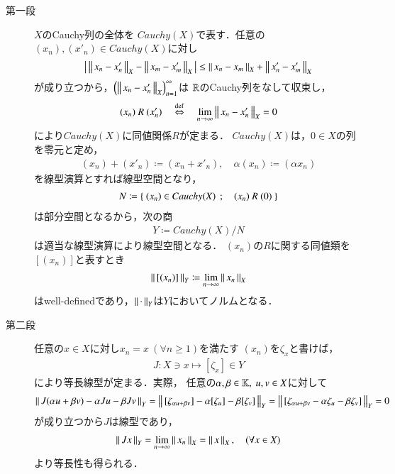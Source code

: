 	\begin{prf}\mbox{}
		\begin{description}
			\item[第一段]
				$X$のCauchy列の全体を
				$Cauchy(X)$で表す．任意の$(x_n),(x'_n) \in Cauchy(X)$に対し
				\begin{align}
					\left|\, \left\|\, x_n - x'_n\, \right\|_{X} - \left\|\, x_m - x'_m\, \right\|_{X}\, \right|
					\leq \left\|\, x_n - x_m\, \right\|_{X} + \left\|\, x'_n - x'_m\, \right\|_{X}
				\end{align}
				が成り立つから，$\left( \left\|\, x_n - x'_n\, \right\|_{X} \right)_{n=1}^\infty$は
				$\mathbb{R}$のCauchy列をなして収束し，
				\begin{align}
					(x_n)\ R\ (x'_n)
					\quad \overset{\mathrm{def}}{\Leftrightarrow} \quad \lim_{n \to \infty} \left\|\, x_n - x'_n\, \right\|_{X} = 0
				\end{align}
				により$Cauchy(X)$に同値関係$R$が定まる．
				$Cauchy(X)$は，$0 \in X$の列を零元と定め，
				\begin{align}
					(x_n) + (x'_n) \coloneqq (x_n + x'_n),
					\quad \alpha (x_n) \coloneqq (\alpha x_n)
				\end{align}
				を線型演算とすれば線型空間となり，
				\begin{align}
					N \coloneqq \left\{\ (x_n) \in Cauchy(X)\ \, ; \quad (x_n)\ R\ (0)\ \right\}
				\end{align}
				は部分空間となるから，次の商
				\begin{align}
					Y \coloneqq Cauchy(X) / N
				\end{align}
				は適当な線型演算により線型空間となる．
				$(x_n)$の$R$に関する同値類を$[(x_n)]$と表すとき
				\begin{align}
					\left\|\, [(x_n)]\, \right\|_{Y} \coloneqq \lim_{n \to \infty} \left\|\, x_n\, \right\|_{X}
					\label{eq:thm_expansion_of_normed_space_1}
				\end{align}
				はwell-definedであり，$\left\|\, \cdot\, \right\|_{Y}$は$Y$においてノルムとなる．
			
			\item[第二段]
				任意の$x \in X$に対し$x_n = x\ (\forall n \geq 1)$を満たす
				$(x_n)$を$\zeta_x$と書けば，
				\begin{align}
					J: X \ni x \longmapsto [\zeta_x] \in Y
					\label{eq:thm_expansion_of_normed_space_2}
				\end{align}
				により等長線型が定まる．実際，
				任意の$\alpha,\beta \in \mathbb{K},\ u,v \in X$に対して
				\begin{align}
					\left\|\, J (\alpha u + \beta v) - \alpha J u - \beta J v\, \right\|_{Y}
					= \left\|\, [\zeta_{\alpha u + \beta v}] - \alpha [\zeta_u] - \beta [\zeta_v]\, \right\|_{Y}
					= \left\|\, [\zeta_{\alpha u + \beta v} - \alpha \zeta_u - \beta \zeta_v]\, \right\|_{Y}
					= 0
				\end{align}
				が成り立つから$J$は線型であり，
				\begin{align}
					\left\|\, J x\, \right\|_{Y} = \lim_{n \to \infty} \left\|\, x_n\, \right\|_{X}
					= \left\|\, x\, \right\|_{X},
					\quad (\forall x \in X)
				\end{align}
				より等長性も得られる．
			

\end{description}
\end{prf}
